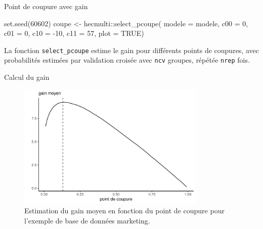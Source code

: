 \documentclass[
  ignorenonframetext,
]{beamer}
\newenvironment{Shaded}{\begin{snugshade}}{\end{snugshade}}
\newcommand{\AttributeTok}[1]{\textcolor[rgb]{0.40,0.45,0.13}{#1}}
\newcommand{\ConstantTok}[1]{\textcolor[rgb]{0.56,0.35,0.01}{#1}}
\newcommand{\DecValTok}[1]{\textcolor[rgb]{0.68,0.00,0.00}{#1}}
\newcommand{\FunctionTok}[1]{\textcolor[rgb]{0.28,0.35,0.67}{#1}}
\newcommand{\NormalTok}[1]{\textcolor[rgb]{0.00,0.23,0.31}{#1}}
\newcommand{\OtherTok}[1]{\textcolor[rgb]{0.00,0.23,0.31}{#1}}
\newcommand{\SpecialCharTok}[1]{\textcolor[rgb]{0.37,0.37,0.37}{#1}}
\begin{document}
\begin{frame}[fragile]{Point de coupure avec gain}
\protect\hypertarget{point-de-coupure-avec-gain}{}
\begin{Shaded}
\begin{Highlighting}[numbers=left,,]
\FunctionTok{set.seed}\NormalTok{(}\DecValTok{60602}\NormalTok{)}
\NormalTok{coupe }\OtherTok{\textless{}{-}}\NormalTok{ hecmulti}\SpecialCharTok{::}\FunctionTok{select\_pcoupe}\NormalTok{(}
  \AttributeTok{modele =}\NormalTok{ modele, }
  \AttributeTok{c00 =} \DecValTok{0}\NormalTok{, }
  \AttributeTok{c01 =} \DecValTok{0}\NormalTok{, }
  \AttributeTok{c10 =} \SpecialCharTok{{-}}\DecValTok{10}\NormalTok{, }
  \AttributeTok{c11 =} \DecValTok{57}\NormalTok{,}
  \AttributeTok{plot =} \ConstantTok{TRUE}\NormalTok{)}
\end{Highlighting}
\end{Shaded}

\footnotesize

La fonction \texttt{select\_pcoupe} estime le gain pour différents
points de coupures, avec probabilités estimées par validation croisée
avec \texttt{ncv} groupes, répétée \texttt{nrep} fois.

\normalsize
\end{frame}

\begin{frame}{Calcul du gain}
\protect\hypertarget{calcul-du-gain}{}
\begin{figure}

{\centering \includegraphics[width=0.8\textwidth,height=\textheight]{MATH60602-diapos6_files/figure-beamer/fig-coupure-pondere-1.pdf}

}

\caption{\label{fig-coupure-pondere}Estimation du gain moyen en fonction
du point de coupure pour l'exemple de base de données marketing.}

\end{figure}
\end{frame}
\end{document}
